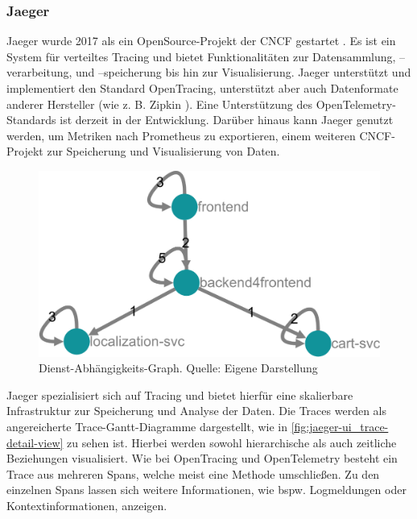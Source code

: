 \subsubsection{Jaeger}
\label{subsec:jaeger}

Jaeger wurde 2017 als ein OpenSource-Projekt der CNCF gestartet \cite{Jaeger}. Es ist ein System für verteiltes Tracing und bietet Funktionalitäten zur Datensammlung, --verarbeitung, und --speicherung bis hin zur Visualisierung. Jaeger unterstützt und implementiert den Standard OpenTracing, unterstützt aber auch Datenformate anderer Hersteller (wie z. B. Zipkin \cite{Zipkin}). Eine Unterstützung des OpenTelemetry-Standards ist derzeit in der Entwicklung. Darüber hinaus kann Jaeger genutzt werden, um Metriken nach Prometheus \cite{Prometheus} zu exportieren, einem weiteren CNCF-Projekt zur Speicherung und Visualisierung von Daten.

\begin{figure}
\centering
\includegraphics[width=\linewidth]{img/03_methoden/jaeger_dependency-graph.png}
\caption{Dienst-Abhängigkeits-Graph. Quelle: Eigene Darstellung}
\label{fig:jaeger-ui_dependency-graph}
\end{figure}

Jaeger spezialisiert sich auf Tracing und bietet hierfür eine skalierbare Infrastruktur zur Speicherung und Analyse der Daten. Die Traces werden als angereicherte Trace-Gantt-Diagramme dargestellt, wie in \autoref{fig:jaeger-ui_trace-detail-view} zu sehen ist. Hierbei werden sowohl hierarchische als auch zeitliche Beziehungen visualisiert. Wie bei OpenTracing und OpenTelemetry besteht ein Trace aus mehreren Spans, welche meist eine Methode umschließen. Zu den einzelnen Spans lassen sich weitere Informationen, wie bspw. Logmeldungen oder Kontextinformationen, anzeigen.


